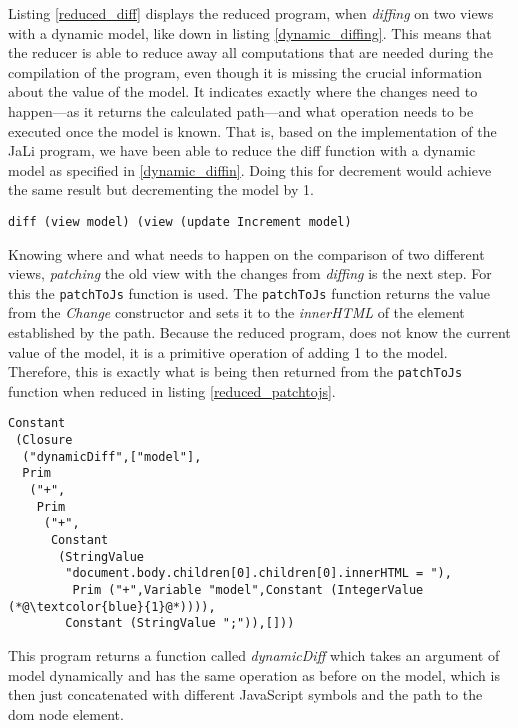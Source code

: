 Listing \ref{reduced_diff} displays the reduced program, when \textit{diffing} on two views with a dynamic model, like down in listing \ref{dynamic_diffing}. This means that the reducer is able to reduce away all computations that are needed during the compilation of the program, even though it is missing the crucial information about the value of the model. It indicates exactly where the changes need to happen---as it returns the calculated path---and what operation needs to be executed once the model is known. That is, based on the implementation of the JaLi program, we have been able to reduce the diff function with a dynamic model as specified in \ref{dynamic_diffin}. Doing this for decrement would achieve the same result but decrementing the model by 1.

\begin{lstlisting}[columns=fullflexible, label={dynamic_diffing}, language=Other, caption={Dynamisc diffing}]
diff (view model) (view (update Increment model)
\end{lstlisting}

Knowing where and what needs to happen on the comparison of two different views, \textit{patching} the old view with the changes from \textit{diffing} is the next step. For this the \texttt{patchToJs} function is used.
The \texttt{patchToJs} function returns the value from the \textit{Change} constructor and sets it to the \textit{innerHTML} of the element established by the path.
Because the reduced program, does not know the current value of the model, it is a primitive operation of adding 1 to the model.
Therefore, this is exactly what is being then returned from the \texttt{patchToJs} function when reduced in listing \ref{reduced_patchtojs}.

\begin{lstlisting}[columns=fullflexible, label={reduced_patchtojs}, language=Other, caption={Reduced result from calling patchToJs with the result from dynamic diff}]
Constant
 (Closure
  ("dynamicDiff",["model"],
  Prim
   ("+",
    Prim
     ("+",
      Constant
       (StringValue
        "document.body.children[0].children[0].innerHTML = "),
         Prim ("+",Variable "model",Constant (IntegerValue (*@\textcolor{blue}{1}@*)))),
        Constant (StringValue ";")),[]))
\end{lstlisting}

This program returns a function called \textit{dynamicDiff} which takes an argument of model dynamically and has the same operation as before on the model, which is then just concatenated with different JavaScript symbols and the path to the \gls{dom} node element.

